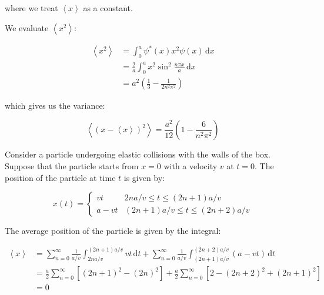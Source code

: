 \documentclass[12pt]{article}
\begin{document}
where we treat $\left\langle x \right\rangle$ as a constant.

We evaluate $\left\langle x^{2} \right\rangle$:

\begin{equation}
    \begin{split}
        \left\langle x^{2} \right\rangle &= \int_{0}^{a} \psi^{*}(x) x^{2} \psi(x) \, \mathrm{d}x \\
        &= \frac{2}{a} \int_{0}^{a} x^{2} \sin^{2} \frac{n\pi x}{a} \, \mathrm{d}x \\
        &= a^{2} \left( \frac{1}{3} - \frac{1}{2n^{2}\pi^{2}} \right)
    \end{split}
\end{equation}

which gives us the variance:

\begin{equation}
    \left\langle (x - \left\langle x \right\rangle)^{2} \right\rangle = \frac{a^{2}}{12} \left( 1 - \frac{6}{n^{2}\pi^{2}} \right)
\end{equation}

Consider a particle undergoing elastic collisions with the walls of the box. Suppose that the particle starts from $x = 0$ with a velocity $v$ at $t = 0$. The position of the particle at time $t$ is given by:

\begin{equation}
    x(t) =
    \begin{cases}
        vt     & 2na/v \leq t \leq (2n + 1)a/v       \\
        a - vt & (2n + 1)a/v \leq t \leq (2n + 2)a/v
    \end{cases}
\end{equation}

The average position of the particle is given by the integral:

\begin{equation}
    \begin{split}
        \left\langle x \right\rangle &= \sum_{n = 0}^{\infty} \frac{1}{a/v} \int_{2na/v}^{(2n + 1)a/v} vt \, \mathrm{d}t + \sum_{n = 0}^{\infty} \frac{1}{a/v} \int_{(2n + 1)a/v}^{(2n + 2)a/v} (a - vt) \, \mathrm{d}t \\
        &= \frac{a}{2} \sum_{n = 0}^{\infty} \left[ (2n + 1)^{2} - (2n)^{2} \right] + \frac{a}{2} \sum_{n = 0}^{\infty} \left[ 2 - (2n + 2)^{2} + (2n + 1)^{2} \right] \\
        &= 0
    \end{split}
\end{equation}
\end{document}

